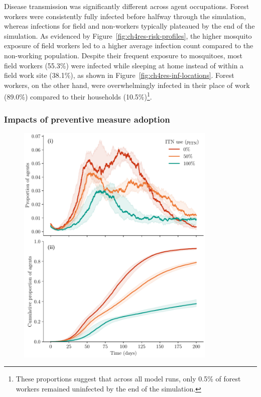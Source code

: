Disease transmission was significantly different across agent occupations. Forest workers were consistently fully infected before halfway through the simulation, whereas infections for field and non-workers typically plateaued by the end of the simulation. As evidenced by Figure~\ref{fig:ch4res-risk-profiles}, the higher mosquito exposure of field workers led to a higher average infection count compared to the non-working population. Despite their frequent exposure to mosquitoes, most field workers (55.3\%) were infected while sleeping at home instead of within a field work site (38.1\%), as shown in Figure~\ref{fig:ch4res-inf-locations}. Forest workers, on the other hand, were overwhelmingly infected in their place of work (89.0\%) compared to their households (10.5\%)\footnote{These proportions suggest that across all model runs, only 0.5\% of forest workers remained uninfected by the end of the simulation.}.

\subsubsection{Impacts of preventive measure adoption}\label{sec:extended-model-p-itn-impacts}

\begin{figure}[htb!]
     \centering
     \includegraphics[width=0.85\textwidth]{figures/ch4/itn_agent_infection_p_use.pdf}
    \label{fig:ch4res-itn-dynamics}
\end{figure}

